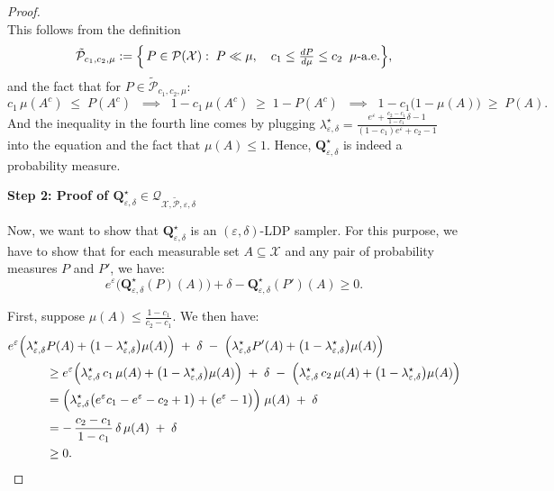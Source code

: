\documentclass[accepted]{article}
\theoremstyle{plain} %
\theoremstyle{definition}
\theoremstyle{remark}
\newcommand{\eps}{\varepsilon}
\newcommand{\bQ}{\mathbf{Q}}
\begin{document}
\begin{proof}
\[\]
This follows from the definition
\[
\tilde{\mathcal{P}}_{c_1, c_2, \mu}
:= \Bigl\{\,P \in \mathcal{P}(\mathcal{X}) :\; P \ll \mu,\quad 
  c_1 \le \tfrac{dP}{d\mu} \le c_2 \;\;\mu\text{-a.e.}\Bigr\},
\]
and the fact that for $P \in \tilde{\mathcal{P}}_{c_1, c_2, \mu}$:
\[
c_1 \,\mu(A^c) \;\le\; P(A^c) 
\;\;\implies\;\;
1 - c_1\,\mu(A^c) 
\;\ge\; 1 - P(A^c) 
\;\;\implies\;\;
1 - c_1\bigl(1 - \mu(A)\bigr) 
\;\ge\; P(A).
\]
And the inequality in the fourth line comes by plugging $\lambda^\star_{\varepsilon, \delta} 
    = \frac{e^{\varepsilon} + \frac{c_2 - c_1}{1 - c_1} \delta - 1}
           {(1 - c_1) e^{\varepsilon} + c_2 - 1}$ into the equation and the fact that $\mu(A) \leq 1$. Hence, $\bQ^\star_{\varepsilon, \delta}$ is indeed a probability measure.


    \medskip

    \textbf{Step 2: Proof of $\bQ^\star_{\varepsilon, \delta} \in \mathcal{Q}_{\mathcal{X}, \tilde{\mathcal{P}}, \varepsilon, \delta}$ } 

Now, we want to show that $\bQ^\star_{\varepsilon, \delta}$ is an $(\eps,\delta)$-LDP sampler. For this purpose, we have to show that for each measurable set $A \subseteq \mathcal{X}$ and any pair of probability measures $P$ and $P'$, we have:
\[e^\eps\big(\bQ^\star_{\varepsilon, \delta}(P)(A)\big) + \delta - \bQ^\star_{\varepsilon, \delta}(P')(A) \geq 0.\]

First, suppose \(\mu(A) \le \frac{1 - c_1}{c_2 - c_1}\). We then have:
\begin{align*}
 e^\varepsilon \Bigl(\lambda^\star_{\varepsilon,\delta}& P(A) 
   +   \bigl(1 - \lambda^\star_{\varepsilon,\delta}\bigr)\mu(A)\Bigr)
 \;+\;\delta
 \;-\;\Bigl(\lambda^\star_{\varepsilon,\delta} P'(A) 
   + \bigl(1 - \lambda^\star_{\varepsilon,\delta}\bigr)\mu(A)\Bigr)\\
&\ge 
  e^\varepsilon \Bigl(\lambda^\star_{\varepsilon,\delta}\,c_1\,\mu(A) 
  + \bigl(1 - \lambda^\star_{\varepsilon,\delta}\bigr)\mu(A)\Bigr)
 \;+\;\delta
 \;-\;
 \Bigl(\lambda^\star_{\varepsilon,\delta}\,c_2\,\mu(A)
   + \bigl(1 - \lambda^\star_{\varepsilon,\delta}\bigr)\mu(A)\Bigr)\\
&=\Big(\lambda^\star_{\varepsilon,\delta}\big( e^\eps c_1 - e^\eps - c_2 + 1\big) + \big(e^\eps - 1\big)\Big)
   \;\mu(A)
 \;+\;\delta\\
&= -\,\frac{c_2 - c_1}{1 - c_1}\,\delta\,\mu(A) 
   \;+\;\delta\\
&\ge 0.
\end{align*}


\end{proof}
\end{document}
